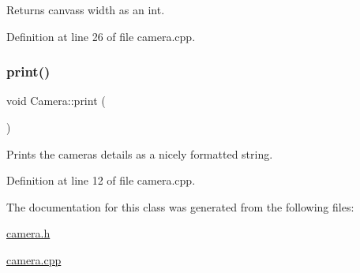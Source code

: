 Returns canvas\textquotesingle{}s width as an int. 



Definition at line 26 of file camera.\+cpp.

\mbox{\label{class_camera_a905d2a0f8677aaad1ee17eb2a842efe5}} 
\subsubsection{\texorpdfstring{print()}{print()}}
{\footnotesize\ttfamily void Camera\+::print (\begin{DoxyParamCaption}{ }\end{DoxyParamCaption})}



Prints the camera\textquotesingle{}s details as a nicely formatted string. 



Definition at line 12 of file camera.\+cpp.



The documentation for this class was generated from the following files\+:\begin{DoxyCompactItemize}
\item 
\mbox{\hyperlink{camera_8h}{camera.\+h}}\item 
\mbox{\hyperlink{camera_8cpp}{camera.\+cpp}}\end{DoxyCompactItemize}

